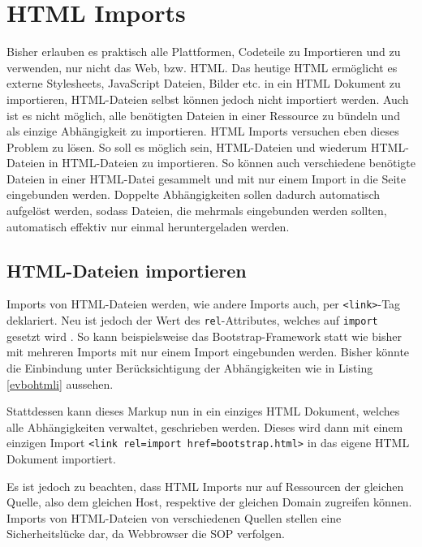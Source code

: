 \section{HTML Imports}\label{html-imports}

Bisher erlauben es praktisch alle Plattformen, Codeteile zu Importieren und zu verwenden, nur nicht das Web, bzw. \ac{HTML}. Das heutige \ac{HTML} ermöglicht es externe Stylesheets, JavaScript Dateien, Bilder etc. in ein \ac{HTML} Dokument zu importieren, \ac{HTML}-Dateien selbst können jedoch nicht importiert werden. Auch ist es nicht möglich, alle benötigten Dateien in einer Ressource zu bündeln und als einzige Abhängigkeit zu importieren. \ac{HTML} Imports versuchen eben dieses Problem zu lösen. So soll es möglich sein, \ac{HTML}-Dateien und wiederum \ac{HTML}-Dateien in \ac{HTML}-Dateien zu importieren. So können auch verschiedene benötigte Dateien in einer \ac{HTML}-Datei gesammelt und mit nur einem Import in die Seite eingebunden werden. Doppelte Abhängigkeiten sollen dadurch automatisch aufgelöst werden, sodass Dateien, die mehrmals eingebunden werden sollten, automatisch effektiv nur einmal heruntergeladen werden.


\subsection{HTML-Dateien importieren}\label{html-dateien-importieren}

Imports von \ac{HTML}-Dateien werden, wie andere Imports auch, per \texttt{\textless{}link\textgreater{}}-Tag deklariert. Neu ist jedoch der Wert des \texttt{rel}-Attributes, welches auf \texttt{import} gesetzt wird \cite[S. 139-147]{citeulike:13844975}. So kann beispielsweise das Bootstrap-Frame\-work statt wie bisher mit mehreren Imports mit nur einem Import eingebunden werden. Bisher könnte die Einbindung unter Berücksichtigung der Abhängigkeiten wie in Listing \ref{evbohtmli} aussehen.



Stattdessen kann dieses Markup nun in ein einziges \ac{HTML} Dokument, welches alle Abhängigkeiten verwaltet, geschrieben werden. Dieses wird dann mit einem einzigen Import \texttt{\textless{}link\ rel=\dq import\dq\ href=\dq bootstrap.html\dq\textgreater{}} in das eigene \ac{HTML} Dokument importiert.

Es ist jedoch zu beachten, dass \ac{HTML} Imports nur auf Ressourcen der gleichen Quelle, also dem gleichen Host, respektive der gleichen Domain zugreifen können. Imports von \ac{HTML}-Dateien von verschiedenen Quellen stellen eine Sicherheitslücke dar, da Webbrowser die \ac{SOP} verfolgen.

